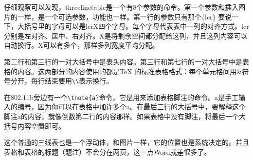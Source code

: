 仔细观察可以发现，threelinetable是一个有8个参数的命令。第一个参数和插入图片的一样，是一个可选参数，功能也一样。第一行的参数只有那个\{lcr\} 要说一下，大括号里的字母可以是lcrX四个字母。每个字母代表表中一列的对齐方式。lcr分别是左对齐、居中、右对齐。X是将剩余空间都分配给这列，并且这列内容可以自动换行。X可以有多个，那样多列宽度平均分配。

第二行和第三行的一对大括号中是表头内容。第三行和第七行的一对大括号中是表格的内容。这两部分的内容使用的都是TeX 的标准表格格式：每个单元格间用\&符号分开，每行结束要用\verb|\\|表示换行。

在802.11b旁边有一个\verb|\tnote{a}|命令，它是用来添加表格脚注的命令。a是手工输入的编号，因为你可以在表格中加许多个a。在最后三行的大括号中，要解释这个脚注a的内容，就像倒数第二行的内容那样。如果表格中没有脚注，将最后一个大括号内容空置即可。

这个普通的三线表也是一个浮动体，和图片一样，它的位置也是系统决定的。并且表格和表格的标题（题注）不会分在两页，这一点Word就差很多了。

